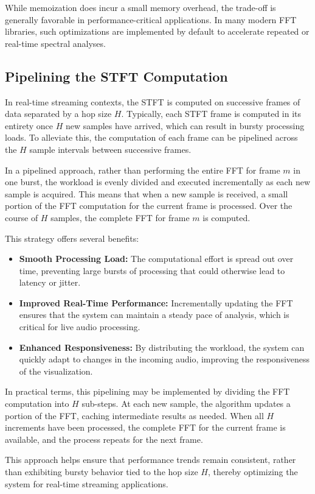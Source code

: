 \documentclass[12pt,letter]{article}
\begin{document}
While memoization does incur a small memory overhead, the trade-off is
generally favorable in performance-critical applications. In many modern FFT
libraries, such optimizations are implemented by default to accelerate
repeated or real-time spectral analyses.

\subsection{Pipelining the STFT Computation}

In real-time streaming contexts, the STFT is computed on successive frames of
data separated by a hop size \( H \). Typically, each STFT frame is computed
in its entirety once \( H \) new samples have arrived, which can result in
bursty processing loads. To alleviate this, the computation of each frame can
be pipelined across the \( H \) sample intervals between successive frames.

In a pipelined approach, rather than performing the entire FFT for frame
\( m \) in one burst, the workload is evenly divided and executed
incrementally as each new sample is acquired. This means that when a new
sample is received, a small portion of the FFT computation for the current
frame is processed. Over the course of \( H \) samples, the complete FFT for
frame \( m \) is computed.

This strategy offers several benefits:
\begin{itemize}
  \item \textbf{Smooth Processing Load:} The computational effort is spread
  out over time, preventing large bursts of processing that could otherwise
  lead to latency or jitter.
  \item \textbf{Improved Real-Time Performance:} Incrementally updating the
  FFT ensures that the system can maintain a steady pace of analysis, which
  is critical for live audio processing.
  \item \textbf{Enhanced Responsiveness:} By distributing the workload, the
  system can quickly adapt to changes in the incoming audio, improving the
  responsiveness of the visualization.
\end{itemize}

In practical terms, this pipelining may be implemented by dividing the FFT
computation into \( H \) sub-steps. At each new sample, the algorithm updates
a portion of the FFT, caching intermediate results as needed. When all
\( H \) increments have been processed, the complete FFT for the current
frame is available, and the process repeats for the next frame.

This approach helps ensure that performance trends remain consistent, rather
than exhibiting bursty behavior tied to the hop size \( H \), thereby
optimizing the system for real-time streaming applications.


\clearpage
\finalPage
\end{document}
